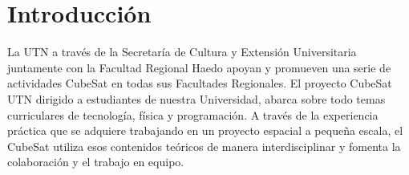 \chapter{Introducción}
La UTN a través de la Secretaría de Cultura y Extensión Universitaria juntamente con la Facultad Regional Haedo apoyan y
promueven una serie de actividades CubeSat en todas sus Facultades Regionales. El proyecto CubeSat UTN dirigido a
estudiantes de nuestra Universidad, abarca sobre todo temas curriculares de tecnología, física y programación. A través
de la experiencia práctica que se adquiere trabajando en un proyecto espacial a pequeña escala, el CubeSat utiliza esos
contenidos teóricos de manera interdisciplinar y fomenta la colaboración y el trabajo en equipo.
